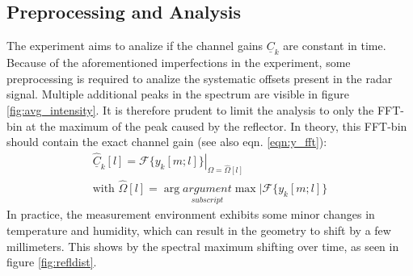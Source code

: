 \subsection{Preprocessing and Analysis}
The experiment aims to analize if the channel gains $\underline C_k$ are constant in time.
Because of the aforementioned imperfections in the experiment, some preprocessing is required to analize the systematic offsets present in the radar signal.
Multiple additional peaks in the spectrum are visible in figure \ref{fig:avg_intensity}.
It is therefore prudent to limit the analysis to only the FFT-bin at the maximum of the peak caused by the reflector.
In theory, this FFT-bin should contain the exact channel gain (see also eqn. \ref{eqn:y_fft}):
\begin{align}
    \hat{\underline{C}}_k[l] = \left.\mathcal{F}\{ y_k[m;l]\}\right|_{\Omega=\hat \Omega[l]} \\
    \text{with } \hat\Omega[l] = \arg \underset{subscript}{argument}\max |\mathcal{F}\{ y_k[m;l]\}
\end{align}
In practice, the measurement environment exhibits some minor changes in temperature and humidity, which can result in the geometry to shift by a few millimeters.
This shows by the spectral maximum shifting over time, as seen in figure \ref{fig:refldist}.
